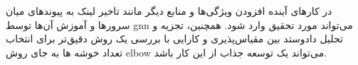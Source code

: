 در کار‌های آینده افزودن ویژگی‌ها و منابع دیگر مانند تاخیر لینک به پیوند‌های میان سرور‌ها و آموزش آن‌ها توسط \gls{gnn} می‌تواند مورد تحقیق وارد شود. همچنین، تجزیه و تحلیل دادوستد بین مقیاس‌پذیری و کارایی با بررسی یک روش دقیق‌تر برای انتخاب تعداد خوشه ها به جای روش elbow می‌تواند یک توسعه جذاب از این کار باشد.
%
%
